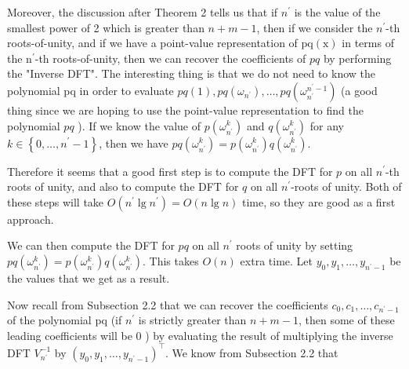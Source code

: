 Moreover, the discussion after Theorem 2 tells us that if $n^{\prime}$ is the value of the smallest power of 2 which is greater than $n+m-1$, then if we consider the $n^{\prime}$-th roots-of-unity, and if we have a point-value representation of $\mathrm{pq}(\mathrm{x})$ in terms of the $\mathrm{n}^{\prime}$-th roots-of-unity, then we can recover the coefficients of $p q$ by performing the "Inverse DFT". The interesting thing is that we do not need to know the polynomial pq in order to evaluate $p q(1), p q\left(\omega_{n^{\prime}}\right), \ldots, p q\left(\omega_{n^{\prime}}^{n^{\prime}-1}\right)$ (a good thing since we are hoping to use the point-value representation to find the polynomial $p q$ ). If we know the value of $p\left(\omega_{n^{\prime}}^{k}\right)$ and $q\left(\omega_{n^{\prime}}^{k}\right)$ for any $k \in\left\{0, \ldots, n^{\prime}-1\right\}$, then we have $p q\left(\omega_{n^{\prime}}^{k}\right)=p\left(\omega_{n^{\prime}}^{k}\right) q\left(\omega_{n^{\prime}}^{k}\right)$.

Therefore it seems that a good first step is to compute the DFT for $p$ on all $n^{\prime}$-th roots of unity, and also to compute the DFT for $q$ on all $n^{\prime}$-roots of unity. Both of these steps will take $O\left(n^{\prime} \lg n^{\prime}\right)=O(n \lg n)$ time, so they are good as a first approach.

We can then compute the DFT for $p q$ on all $n^{\prime}$ roots of unity by setting $p q\left(\omega_{n^{\prime}}^{k}\right)=p\left(\omega_{n^{\prime}}^{k}\right) q\left(\omega_{n^{\prime}}^{k}\right)$. This takes $O(n)$ extra time. Let $y_{0}, y_{1}, \ldots, y_{n^{\prime}-1}$ be the values that we get as a result.

Now recall from Subsection 2.2 that we can recover the coefficients $c_{0}, c_{1}, \ldots, c_{n^{\prime}-1}$ of the polynomial pq (if $n^{\prime}$ is strictly greater than $n+m-1$, then some of these leading coefficients will be 0 ) by evaluating the result of multiplying the inverse DFT $V_{n^{\prime}}^{-1}$ by $\left(y_{0}, y_{1}, \ldots, y_{n^{\prime}-1}\right)^{\top}$. We know from Subsection 2.2 that

